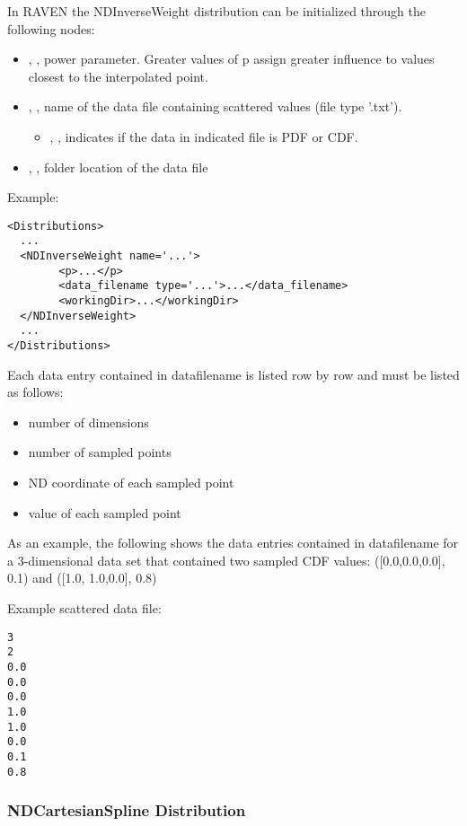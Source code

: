 In RAVEN the NDInverseWeight distribution can be initialized through the following nodes:
\begin{itemize}
\item {}, , power parameter. Greater values of p assign greater influence to values closest to the interpolated point.
\item {}, ,  name of the data file containing scattered values (file type '.txt').
\begin{itemize}
\item {}, ,  indicates if the data in indicated file is PDF or CDF.
\end{itemize}
\item {}, , folder location of the data file
\end{itemize}

Example:
\begin{lstlisting}[style=XML]
<Distributions>
  ...
  <NDInverseWeight name='...'>
        <p>...</p>
        <data_filename type='...'>...</data_filename>
        <workingDir>...</workingDir>
  </NDInverseWeight>
  ...
</Distributions>
\end{lstlisting}

Each data entry contained in data\textunderscore filename is listed row by row and must be listed as follows:
\begin{itemize}
\item number of dimensions
\item number of sampled points
\item ND coordinate of each sampled point
\item value of each sampled point
\end{itemize}

As an example, the following shows the data entries contained in data\textunderscore filename for a 3-dimensional data set that contained two sampled CDF values: ([0.0,0.0,0.0], 0.1) and ([1.0, 1.0,0.0], 0.8)

Example scattered data file:
\begin{lstlisting}
3
2
0.0
0.0
0.0
1.0
1.0
0.0
0.1
0.8
\end{lstlisting}

\subsubsection{NDCartesianSpline Distribution}
\label{NDCartesianSpline}

